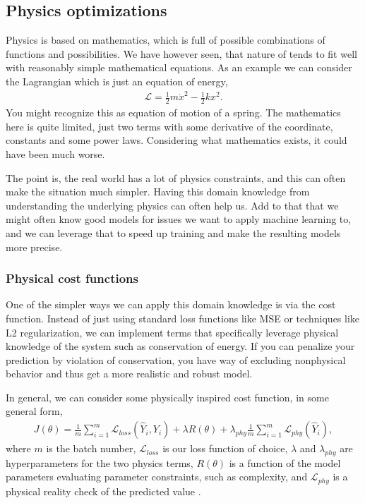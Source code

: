 \documentclass[12pt,a4paper]{article} %
\numberwithin{equation}{section}
\newcommand{\paa}[1]{\left(#1\right)}
\begin{document}
	\subsection{Physics optimizations}
		Physics is based on mathematics, which is full of possible combinations of functions and possibilities. We have however seen, that nature of tends to fit well with reasonably simple mathematical equations. As an example we can consider the Lagrangian which is just an equation of energy,
		\begin{gather}
			\mathcal{L} = \frac{1}{2}m\dot{x}^2 - \frac{1}{2}k x^2.
		\end{gather}
		You might recognize this as equation of motion of a spring. The mathematics here is quite limited, just two terms with some derivative of the coordinate, constants and some power laws. Considering what mathematics exists, it could have been much worse.
		
		The point is, the real world has a lot of physics constraints, and this can often make the situation much simpler. Having this domain knowledge from understanding the underlying physics can often help us. Add to that that we might often know good models for issues we want to apply machine learning to, and we can leverage that to speed up training and make the resulting models more precise. 
	
		\subsubsection{Physical cost functions}
			One of the simpler ways we can apply this domain knowledge is via the cost function. Instead of just using standard loss functions like MSE or techniques like L2 regularization, we can implement terms that specifically leverage physical knowledge of the system such as conservation of energy. If you can penalize your prediction by violation of conservation, you have way of excluding nonphysical behavior and thus get a more realistic and robust model.
			
			In general, we can consider some physically inspired cost function, in some general form,
			\begin{gather}\label{eq:physics_loss}
				J(\theta) = \frac{1}{m} \sum_{i=1}^m \mathcal{L}_{loss}\paa{\hat{Y}_i, Y_i} + \lambda R(\theta) + \lambda_{phy} \frac{1}{m}  \sum_{i=1}^m \mathcal{L}_{phy}(\hat{Y}_i),
			\end{gather}
			where $m$ is the batch number, $\mathcal{L}_{loss}$ is our loss function of choice, $\lambda$ and $\lambda_{phy}$ are hyperparameters for the two physics terms, $R(\theta)$ is a function of the model parameters evaluating parameter constraints, such as complexity, and $\mathcal{L}_{phy}$ is a physical reality check of the predicted value \cite{daw:2017}.
			
\end{document}
